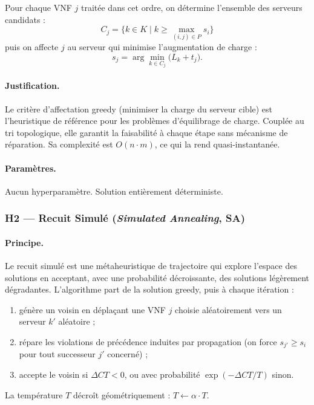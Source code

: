 \documentclass{article}
\begin{document}
Pour chaque VNF $j$ traitée dans cet ordre, on détermine l'ensemble des serveurs
candidats :
\[
  C_j = \bigl\{ k \in K \mid k \ge \max_{(i,j) \in P} s_i \bigr\}
\]
puis on affecte $j$ au serveur qui minimise l'augmentation de charge :
\[
  s_j = \arg\min_{k \in C_j} \bigl( L_k + t_j \bigr).
\]

\paragraph{Justification.}
Le critère d'affectation greedy (minimiser la charge du serveur cible) est
l'heuristique de référence pour les problèmes d'équilibrage de charge. Couplée
au tri topologique, elle garantit la faisabilité à chaque étape sans mécanisme
de réparation. Sa complexité est $O(n \cdot m)$, ce qui la rend quasi-instantanée.

\paragraph{Paramètres.} Aucun hyperparamètre. Solution entièrement déterministe.

\subsubsection{H2 --- Recuit Simulé (\textit{Simulated Annealing}, SA)}

\paragraph{Principe.}
Le recuit simulé est une métaheuristique de trajectoire qui explore l'espace des
solutions en acceptant, avec une probabilité décroissante, des solutions légèrement
dégradantes. L'algorithme part de la solution greedy, puis à chaque itération :
\begin{enumerate}
  \item génère un voisin en déplaçant une VNF $j$ choisie aléatoirement vers un
    serveur $k'$ aléatoire ;
  \item répare les violations de précédence induites par propagation (on force
    $s_{j'} \ge s_i$ pour tout successeur $j'$ concerné) ;
  \item accepte le voisin si $\Delta CT < 0$, ou avec probabilité
    $\exp(-\Delta CT / T)$ sinon.
\end{enumerate}
La température $T$ décroît géométriquement : $T \leftarrow \alpha \cdot T$.
\end{document}
